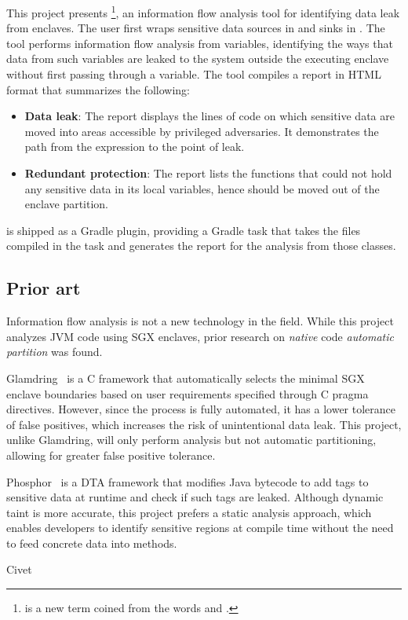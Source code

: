 This project presents \pname{}
\footnote{ is a new term coined from the words  and .},
an information flow analysis tool
for identifying data leak from enclaves.
The user first wraps sensitive data sources in  and sinks in .
The tool performs information flow analysis from  variables,
identifying the ways that data from such variables are leaked
to the system outside the executing enclave
without first passing through a  variable.
The tool compiles a report in HTML format that summarizes the following:
\begin{itemize}
	\item \textbf{Data leak}:
		The report displays the lines of code on which sensitive data are moved
		into areas accessible by privileged adversaries.
		It demonstrates the path from the  expression to the point of leak.
	\item \textbf{Redundant protection}:
		The report lists the functions that could not hold any sensitive data in its local variables,
		hence should be moved out of the enclave partition.
\end{itemize}

\pname{} is shipped as a Gradle plugin,
providing a Gradle task that
takes the  files compiled in the  task
and generates the report for the analysis from those classes.

\subsection{Prior art}\label{subsec:prior-art}
Information flow analysis is not a new technology in the field.
While this project analyzes JVM code using SGX enclaves,
prior research on \emph{native} code \emph{automatic partition} was found.

Glamdring~\cite{glamdring} is a C framework that
automatically selects the minimal SGX enclave boundaries
based on user requirements specified through C pragma directives.
However, since the process is fully automated,
it has a lower tolerance of false positives,
which increases the risk of unintentional data leak.
This project, unlike Glamdring, will only perform analysis but not automatic partitioning,
allowing for greater false positive tolerance.

Phosphor~\cite{BellJonathan2014Pidd} is a DTA framework
that modifies Java bytecode to add tags to sensitive data at runtime
and check if such tags are leaked.
Although dynamic taint is more accurate,
this project prefers a static analysis approach,
which enables developers to identify sensitive regions at compile time
without the need to feed concrete data into methods.

Civet~\cite{civet} %
